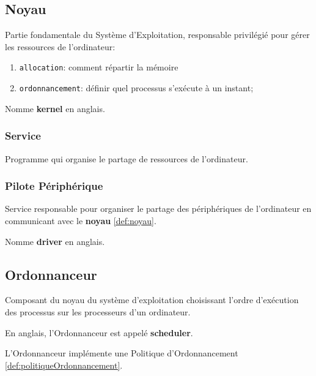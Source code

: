 \documentclass{article}
\begin{document}
\subsection{Noyau}
\begin{definition}\label{def:noyau}
    Partie fondamentale du Système d'Exploitation, responsable privilégié pour gérer les ressources de l'ordinateur:
    \begin{enumerate}[noitemsep]
        \item \texttt{allocation}: comment répartir la mémoire
        \item \texttt{ordonnancement}: définir quel processus s'exécute à un instant;
    \end{enumerate}
    
    \begin{remark}
        Nomme \textbf{kernel} en anglais.
    \end{remark}
\end{definition}

\subsubsection{Service}
\begin{definition}\label{def:service}
    Programme qui organise le partage de ressources de l'ordinateur.
\end{definition}

\subsubsection{Pilote Périphérique}
\begin{definition}\label{def:pilotePeripherique}
    Service responsable pour organiser le partage des périphériques de l'ordinateur en communicant avec le \textbf{noyau} \ref{def:noyau}.
    
    \begin{remark}
        Nomme \textbf{driver} en anglais.
    \end{remark}
\end{definition}


\subsection{Ordonnanceur}
\begin{definition}\label{def:ordonnanceur}
    Composant du noyau du système d'exploitation choisissant l'ordre d'exécution des processus sur les processeurs d'un ordinateur.
    
    \begin{remark}
        En anglais, l'Ordonnanceur est appelé \textbf{scheduler}.
    \end{remark}
    L'Ordonnanceur implémente une Politique d'Ordonnancement \ref{def:politiqueOrdonnancement}.
\end{definition}
\end{document}
